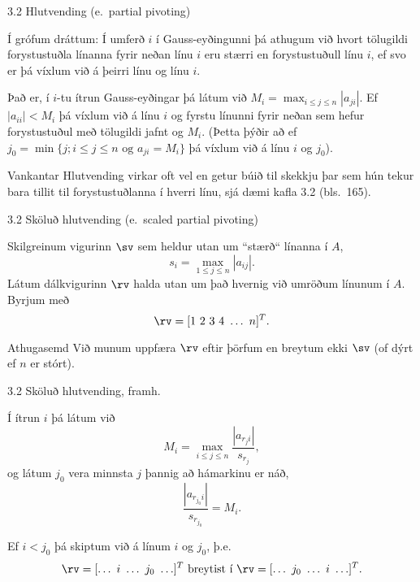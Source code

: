 \begin{frame}{3.2 Hlutvending (e.~partial pivoting)}
\begin{block}{}
 Í grófum dráttum: Í umferð $i$ í Gauss-eyðingunni þá athugum við hvort tölugildi 
forystu\-stuðla línanna fyrir neðan
línu $i$ eru stærri en forystustuðull línu $i$, ef svo er þá víxlum við á 
þeirri línu og línu $i$.

\pause
\medskip

Það er, í $i$-tu ítrun Gauss-eyðingar þá látum við $M_i = \max_{i\leq j \leq n} |a_{ji}|$.
Ef $|a_{ii}| < M_i$ þá víxlum við á línu $i$ og fyrstu línunni fyrir neðan 
sem hefur forystustuðul með tölugildi jafnt og $M_i$. \pause (Þetta þýðir að ef 
$j_0 = \min\{ j ; i \leq j\leq n \text{ og } a_{ji} = M_i \}$ þá víxlum við á línu $i$ og $j_0$).
\end{block}

\pause
\begin{block}{Vankantar}
Hlutvending virkar oft vel en getur búið til skekkju þar sem hún tekur bara tillit til
forystustuðlanna í hverri línu, sjá dæmi kafla 3.2 (bls.~165). 
\end{block}
\end{frame}

\begin{frame}{3.2 Sköluð hlutvending (e.~scaled partial pivoting)}
 \begin{block}{}
  Skilgreinum vigurinn $\sv$ sem heldur utan um ``stærð`` línanna í $A$,
$$
s_i = \max_{1\leq j \leq n} |a_{ij}|.
$$
\pause
Látum dálkvigurinn $\rv$ halda utan um það hvernig við umröðum línunum í $A$.
Byrjum með
$$
\rv = [1\ 2\ 3\ 4\ \ldots\ n]^T.
$$
\end{block}
\pause


\begin{block}{Athugasemd} 
Við munum uppfæra $\rv$ eftir þörfum en breytum ekki $\sv$ (of dýrt ef $n$ er stórt). 
\end{block}

\end{frame}

\begin{frame}{3.2 Sköluð hlutvending, framh.}
\begin{block}{}
Í ítrun $i$ þá látum við 
$$
M_i = \max_{i \leq j \leq n} \frac{|a_{{r_j}i}|}{s_{r_j}},
$$
og látum $j_0$ vera minnsta $j$ þannig að hámarkinu er náð, 
$$
\frac{ |a_{r_{j_0}i}|}{s_{r_{j_0}}} = M_i.
$$
\pause

Ef $i < j_0$ þá skiptum við á línum $i$ og $j_0$, \pause þ.e.
$$
\rv = [\ldots\ i\ \ldots\ j_0\ \ldots]^T \text{ breytist í }
\rv = [\ldots\ j_0\ \ldots\ i\ \ldots]^T.
$$
 \end{block}
\end{frame}

